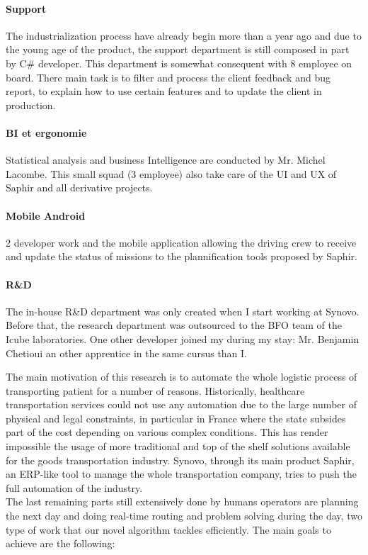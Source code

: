 \documentclass[12pt]{memoir}
\begin{document}
\paragraph{Support}\label{support}

The industrialization process have already begin more than a year ago and due to the young age of the product, the support department is still composed in part by C\# developer. This department is somewhat consequent with 8 employee on board. There main task is to filter and process the client feedback and bug report, to explain how to use certain features and to update the client in production. 


\paragraph{BI et ergonomie}\label{bi-et-ergonomie}

Statistical analysis and business Intelligence are conducted by Mr. Michel Lacombe. This small squad (3 employee) also take care of the UI and UX of Saphir and all derivative projects.


\paragraph{Mobile Android}\label{mobile-android}

2 developer work and the mobile application allowing the driving crew to receive and update the status of missions to the plannification tools proposed by Saphir.

\paragraph{R\&D}\label{rd}

The in-house R\&D department was only created when I start working at Synovo.
Before that, the research department was outsourced to the BFO team of the Icube laboratories. 
One other developer joined my during my stay:  Mr. Benjamin Chetioui an other apprentice in the same cursus than I.


\label{sub:Synovo}

\label{sec:Context of research}
\bigskip
The main motivation of this research is to automate the whole logistic process of
transporting patient for a number of reasons. Historically, healthcare transportation
services could not use any automation due to the large number of physical and legal
constraints, in particular in France where the state subsides part of the cost
depending on various complex conditions. This has render impossible the usage of
more traditional and top of the shelf solutions available for the goods
transportation industry. Synovo, through its main product Saphir, an ERP-like tool
to manage the whole transportation company, tries to push the full automation of the
industry. \\
The last remaining parts still extensively done by humans operators are planning the
next day and doing real-time routing and problem solving during the day, two type of
work that our novel algorithm tackles efficiently. The main goals to achieve are the
following:
\end{document}
